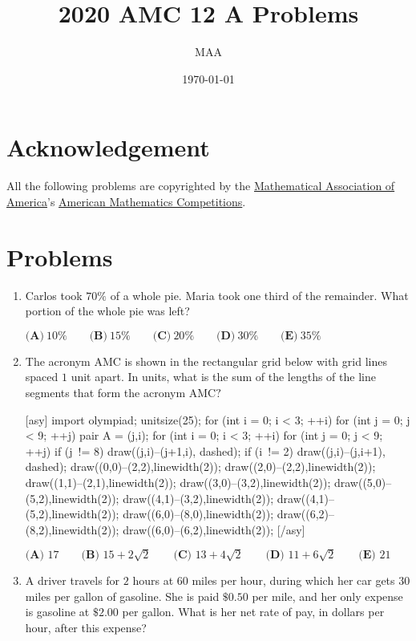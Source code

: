 \documentclass{article}%
\title{2020 AMC 12 A Problems}%
\author{MAA}%
\date{\today}%
\begin{document}
%
\normalsize%
\maketitle%
\section{Acknowledgement}%
\label{sec:Acknowledgement}%
All the following problems are copyrighted by the \href{https://www.maa.org/}{Mathematical Association of America}'s \href{https://www.maa.org/math-competitions}{American Mathematics Competitions}.

%
\section{Problems}%
\label{sec:Problems}%
\begin{enumerate}%
\item%
[\textbf{Problem 1}]Carlos took $70\%$ of a whole pie. Maria took one third of the remainder. What portion of the whole pie was left?

$\textbf{(A)}\ 10\%\qquad\textbf{(B)}\ 15\%\qquad\textbf{(C)}\ 20\%\qquad\textbf{(D)}\ 30\%\qquad\textbf{(E)}\ 35\%$

%
\item%
[\textbf{Problem 2}]The acronym AMC is shown in the rectangular grid below with grid lines spaced $1$ unit apart. In units, what is the sum of the lengths of the line segments that form the acronym AMC$?$

[asy] import olympiad; unitsize(25); for (int i = 0; i < 3; ++i) { for (int j = 0; j < 9; ++j) { pair A = (j,i);  } } for (int i = 0; i < 3; ++i) { for (int j = 0; j < 9; ++j) { if (j != 8) { draw((j,i)--(j+1,i), dashed); } if (i != 2) { draw((j,i)--(j,i+1), dashed); } } } draw((0,0)--(2,2),linewidth(2)); draw((2,0)--(2,2),linewidth(2)); draw((1,1)--(2,1),linewidth(2)); draw((3,0)--(3,2),linewidth(2)); draw((5,0)--(5,2),linewidth(2)); draw((4,1)--(3,2),linewidth(2)); draw((4,1)--(5,2),linewidth(2)); draw((6,0)--(8,0),linewidth(2)); draw((6,2)--(8,2),linewidth(2)); draw((6,0)--(6,2),linewidth(2)); [/asy]

$\textbf{(A) } 17 \qquad \textbf{(B) } 15 + 2\sqrt{2} \qquad \textbf{(C) } 13 + 4\sqrt{2} \qquad \textbf{(D) } 11 + 6\sqrt{2} \qquad \textbf{(E) } 21$

%
\item%
[\textbf{Problem 3}]A driver travels for $2$ hours at $60$ miles per hour, during which her car gets $30$ miles per gallon of gasoline. She is paid $\$0.50$ per mile, and her only expense is gasoline at $\$2.00$ per gallon. What is her net rate of pay, in dollars per hour, after this expense?


\end{enumerate}
\end{document}
